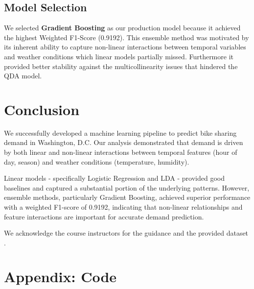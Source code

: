 \documentclass{article}
\begin{document}
\subsection{Model Selection}
We selected \textbf{Gradient Boosting} as our production model because it achieved the highest Weighted F1-Score (0.9192). This ensemble method was motivated by its inherent ability to capture non-linear interactions between temporal variables and weather conditions which linear models partially missed. Furthermore it provided better stability against the multicollinearity issues that hindered the QDA model.


\section{Conclusion}
We successfully developed a machine learning pipeline to predict bike sharing demand in Washington, D.C. Our analysis demonstrated that demand is driven by both linear and non-linear interactions between temporal features (hour of day, season) and weather conditions (temperature, humidity).

Linear models - specifically Logistic Regression  and LDA - provided good baselines and captured a substantial portion of the underlying patterns. However, ensemble methods, particularly Gradient Boosting, achieved superior performance with a weighted F1-score of 0.9192, indicating that non-linear relationships and feature interactions are important for accurate demand prediction.


\begin{ack}
We acknowledge the course instructors for the guidance and the provided dataset \cite{uu_course}.
\end{ack}

 
           


\appendix
\section{Appendix: Code}

\end{document}
